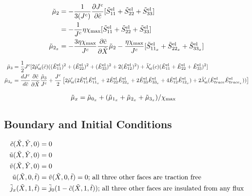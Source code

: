 \documentclass[../main.tex]{subfiles}
\begin{document}
\begin{align}
    \td{\mu}_2 &= -\fc{1}{3(\jc)}\pdiff{ \jc}{\tc}[\tSel{11} + \tSel{22} + \tSel{33}] \\
     &= -\fc{1}{\jc} \eta\xmax [\tSel{11} + \tSel{22} + \tSel{33}] \\
     \td{\mu}_{2_x} &= -\fc{3\eta\xmax}{\jc}\tcx \td{\mu}_2 - \fc{\eta\xmax}{\jc}[\tSel{11_x} + \tSel{22_x} + \tSel{33_x}] 
\end{align}

\begin{align}
     \td{\mu}_3 &= \fc{1}{2}\jc[2\tmusi'(\td{c})((\tEel{11})^2 + (\tEel{22})^2 + (\tEel{33})^2 + 2 (\tEel{12})^2) + \tlamsi'(c)(\tEel{11} + \tEel{22} + \tEel{33})^2]\\
      \td{\mu}_{3_x} &= \djc \tcx \fc{\td{\mu}_3}{\jc} + \fc{\jc}{2}\left[2\tmusi'( 2\tEel{11}\tEel{11_x} + 2\tEel{22}\tEel{22_x} + 2\tEel{33}\tEel{33_x} + 4\tEel{12}\tEel{12_x}) + 2\tlamsi'(\tEel{trace}\tEel{trace_x}) )   \right]
\end{align}

\begin{align}
\td{\mu}_x &= \td{\mu}_{0_x} + (\td{\mu}_{1_x} + \td{\mu}_{2_x} + \td{\mu}_{3_x})/\xmax 
\end{align}

\subsection{Boundary and Initial Conditions}
\begin{align}
   \tc(\tX, \tY, 0) &= 0 \\
   \tu(\tX, \tY, 0) &= 0 \\
   \tv(\tX, \tY, 0) &= 0 \\
   \tu(\tX, 0, \tt) &= \tv(\tX, 0, \tt) = 0
    \text{; all three other faces are traction free} \\
   \td{j}_x(\tX, 1, \tt) &= \td{j}_0 (1 - \tc(\tX, 1, \tt))
   \text{; all three other faces are insulated from any flux}
\end{align}
\end{document}
